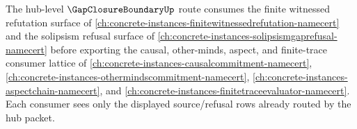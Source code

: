 The hub-level $\GapClosureBoundaryUp$ route consumes the finite witnessed refutation surface of \autoref{ch:concrete-instances-finitewitnessedrefutation-namecert} and the solipsism refusal surface of \autoref{ch:concrete-instances-solipsismgaprefusal-namecert} before exporting the causal, other-minds, aspect, and finite-trace consumer lattice of \autoref{ch:concrete-instances-causalcommitment-namecert}, \autoref{ch:concrete-instances-othermindscommitment-namecert}, \autoref{ch:concrete-instances-aspectchain-namecert}, and \autoref{ch:concrete-instances-finitetraceevaluator-namecert}. Each consumer sees only the displayed source/refusal rows already routed by the hub packet.

